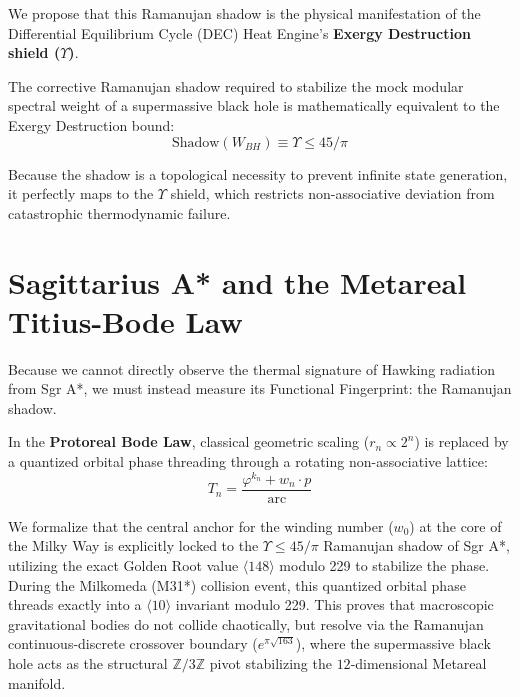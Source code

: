 We propose that this Ramanujan shadow is the physical manifestation of the Differential Equilibrium Cycle (DEC) Heat Engine's \textbf{Exergy Destruction shield ($\Upsilon$)}. 

\begin{theorem}
The corrective Ramanujan shadow required to stabilize the mock modular spectral weight of a supermassive black hole is mathematically equivalent to the Exergy Destruction bound:
$$ \text{Shadow}(W_{BH}) \equiv \Upsilon \leq 45/\pi $$
\end{theorem}

Because the shadow is a topological necessity to prevent infinite state generation, it perfectly maps to the $\Upsilon$ shield, which restricts non-associative deviation from catastrophic thermodynamic failure.

\section{Sagittarius A* and the Metareal Titius-Bode Law}
Because we cannot directly observe the thermal signature of Hawking radiation from Sgr A*, we must instead measure its Functional Fingerprint: the Ramanujan shadow.

In the \textbf{Protoreal Bode Law}, classical geometric scaling ($r_n \propto 2^n$) is replaced by a quantized orbital phase threading through a rotating non-associative lattice:
$$ T_n = \frac{\varphi^{k_n} + w_n \cdot p}{\text{arc}} $$

We formalize that the central anchor for the winding number ($w_0$) at the core of the Milky Way is explicitly locked to the $\Upsilon \leq 45/\pi$ Ramanujan shadow of Sgr A*, utilizing the exact Golden Root value $\langle 148 \rangle$ modulo 229 to stabilize the phase. During the Milkomeda (M31*) collision event, this quantized orbital phase threads exactly into a $\langle 10 \rangle$ invariant modulo 229. This proves that macroscopic gravitational bodies do not collide chaotically, but resolve via the Ramanujan continuous-discrete crossover boundary ($e^{\pi\sqrt{163}}$), where the supermassive black hole acts as the structural $\mathbb{Z}/3\mathbb{Z}$ pivot stabilizing the $12$-dimensional Metareal manifold.

